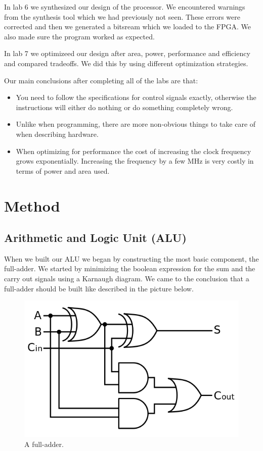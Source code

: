 \documentclass[a4paper,11pt]{article}
\begin{document}
In lab 6 we synthesized our design of the processor. We encountered warnings from the synthesis tool which we had previously not seen. These errors were corrected and then we generated a bitsream which we loaded to the FPGA. We also made sure the program worked as expected.

In lab 7 we optimizeed our design after area, power, performance and efficiency and compared tradeoffs. We did this by using different optimization strategies.

Our main conclusions after completing all of the labs are that:
\begin{itemize}
	\item You need to follow the specifications for control signals exactly, otherwise the instructions will either do nothing or do something completely wrong. 
	\item Unlike when programming, there are more non-obvious things to take care of when describing hardware.
	\item When optimizing for performance the cost of increasing the clock frequency grows exponentially. Increasing the frequency by a few MHz is very costly in terms of power and area used. 
\end{itemize}

\newpage
\section{Method}
\subsection{Arithmetic and Logic Unit (ALU)}

When we built our ALU we began by constructing the most basic component, the full-adder. We started by minimizing the boolean expression for the sum and the carry out signals using a Karnaugh diagram. We came to the conclusion that a full-adder should be built like described in the picture below.

\begin{figure}[h!]
  \centering
  \includegraphics[width=0.5\linewidth]{fulladder.png}
  \caption{A full-adder.}
  \label{fig:etikett}
\end{figure}
\end{document}
